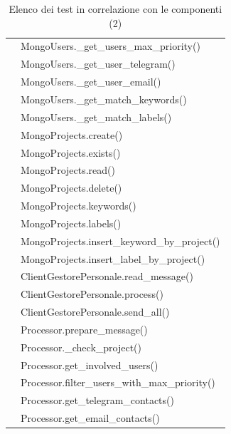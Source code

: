 		\begin{table}[H]
			\centering
			{\def\arraystretch{1.4}
			\begin{tabularx}{\textwidth}{cY}
				\addtotu & MongoUsers.\_get\_users\_max\_priority() \\
				\addtotu & MongoUsers.\_get\_user\_telegram() \\
				\addtotu & MongoUsers.\_get\_user\_email() \\
				\addtotu & MongoUsers.\_get\_match\_keywords() \\
				\addtotu & MongoUsers.\_get\_match\_labels() \\

				\addtotu & MongoProjects.create() \\
				\addtotu & MongoProjects.exists() \\
				\addtotu & MongoProjects.read() \\
				\addtotu & MongoProjects.delete() \\
				\addtotu & MongoProjects.keywords() \\
				\addtotu & MongoProjects.labels() \\
				\addtotu & MongoProjects.insert\_keyword\_by\_project() \\
				\addtotu & MongoProjects.insert\_label\_by\_project() \\

				\addtotu & ClientGestorePersonale.read\_message() \\
				\addtotu & ClientGestorePersonale.process() \\
				\addtotu & ClientGestorePersonale.send\_all() \\

				\addtotu & Processor.prepare\_message() \\
				\addtotu & Processor.\_check\_project() \\
				\addtotu & Processor.get\_involved\_users() \\
				\addtotu & Processor.filter\_users\_with\_max\_priority() \\
				\addtotu & Processor.get\_telegram\_contacts() \\
				\addtotu & Processor.get\_email\_contacts() \\
				\bottomrule
			\end{tabularx}}
			\caption{Elenco dei test in correlazione con le componenti (2)}
		\end{table}